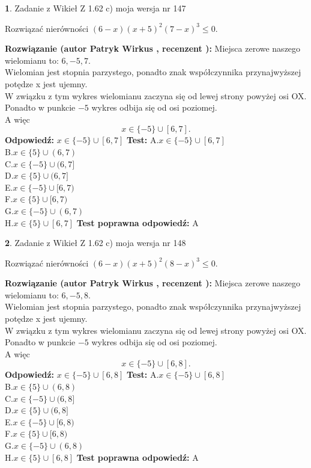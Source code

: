 \documentclass[12pt, a4paper]{article}
\theoremstyle{definition} %
\newtheorem{zad}{}
\newcommand{\zadStart}[1]{\begin{zad}#1\newline}
\newcommand{\zadStop}{\end{zad}}
\newcommand{\rozwStart}[2]{\noindent \textbf{Rozwiązanie (autor #1 , recenzent #2): }\newline}
\newcommand{\rozwStop}{\newline}
\newcommand{\odpStart}{\noindent \textbf{Odpowiedź:}\newline}
\newcommand{\odpStop}{\newline}
\newcommand{\testStart}{\noindent \textbf{Test:}\newline}
\newcommand{\testStop}{\newline}
\newcommand{\kluczStart}{\noindent \textbf{Test poprawna odpowiedź:}\newline}
\newcommand{\kluczStop}{\newline}
\begin{document}
\zadStart{Zadanie z Wikieł Z 1.62 c) moja wersja nr 147}

Rozwiązać nierówności $(6-x)(x+5)^{2}(7-x)^{3}\le0$.
\zadStop
\rozwStart{Patryk Wirkus}{}
Miejsca zerowe naszego wielomianu to: $6, -5, 7$.\\
Wielomian jest stopnia parzystego, ponadto znak współczynnika przy\linebreak najwyższej potędze x jest ujemny.\\ W związku z tym wykres wielomianu zaczyna się od lewej strony powyżej osi OX.\\
Ponadto w punkcie $-5$ wykres odbija się od osi poziomej.\\
A więc $$x \in \{-5\} \cup [6,7].$$
\rozwStop
\odpStart
$x \in \{-5\} \cup [6,7]$
\odpStop
\testStart
A.$x \in \{-5\} \cup [6,7]$\\
B.$x \in \{5\} \cup (6,7)$\\
C.$x \in \{-5\} \cup (6,7]$\\
D.$x \in \{5\} \cup (6,7]$\\
E.$x \in \{-5\} \cup [6,7)$\\
F.$x \in \{5\} \cup [6,7)$\\
G.$x \in \{-5\} \cup (6,7)$\\
H.$x \in \{5\} \cup [6,7]$
\testStop
\kluczStart
A
\kluczStop



\zadStart{Zadanie z Wikieł Z 1.62 c) moja wersja nr 148}

Rozwiązać nierówności $(6-x)(x+5)^{2}(8-x)^{3}\le0$.
\zadStop
\rozwStart{Patryk Wirkus}{}
Miejsca zerowe naszego wielomianu to: $6, -5, 8$.\\
Wielomian jest stopnia parzystego, ponadto znak współczynnika przy\linebreak najwyższej potędze x jest ujemny.\\ W związku z tym wykres wielomianu zaczyna się od lewej strony powyżej osi OX.\\
Ponadto w punkcie $-5$ wykres odbija się od osi poziomej.\\
A więc $$x \in \{-5\} \cup [6,8].$$
\rozwStop
\odpStart
$x \in \{-5\} \cup [6,8]$
\odpStop
\testStart
A.$x \in \{-5\} \cup [6,8]$\\
B.$x \in \{5\} \cup (6,8)$\\
C.$x \in \{-5\} \cup (6,8]$\\
D.$x \in \{5\} \cup (6,8]$\\
E.$x \in \{-5\} \cup [6,8)$\\
F.$x \in \{5\} \cup [6,8)$\\
G.$x \in \{-5\} \cup (6,8)$\\
H.$x \in \{5\} \cup [6,8]$
\testStop
\kluczStart
A
\kluczStop
\end{document}

